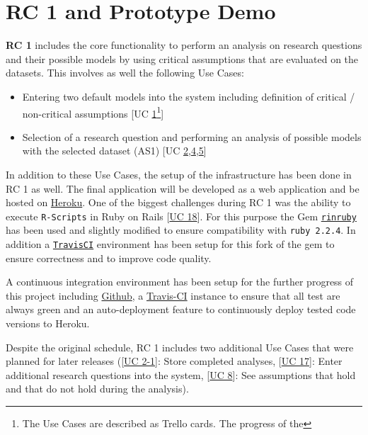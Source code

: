 \documentclass[11pt,twocolumn]{article}
\begin{document}
\section{ RC 1 and Prototype Demo}
\textbf{RC 1} includes the core functionality to perform an analysis on research questions and their possible models by using critical assumptions that are evaluated on the datasets. This involves as well the following Use Cases: 
\begin{itemize}
	\item Entering two default models into the system including definition of critical / non-critical assumptions [UC \href{https://trello.com/c/KEOokZp9}{1}\footnote{The Use Cases are described as Trello cards. The progress of the }]
\item  Selection of a research question and performing an analysis of possible models with the selected dataset (AS1) [UC \href{https://trello.com/c/ebVrFdA5}{2},\href{https://trello.com/c/7NINsfz8}{4},\href{https://trello.com/c/22JGne3r}{5}]
\end{itemize}

In addition to these Use Cases, the setup of the infrastructure has been done in RC 1 as well. The final application will be developed as a web application and be hosted on \href{http://heroku.com}{Heroku}. 
One of the biggest challenges during RC 1 was the ability to execute \texttt{R-Scripts} in Ruby on Rails [\href{https://trello.com/c/dpLHOxbB}{UC 18}]. For this purpose the Gem \href{https://github.com/sebastianzillessen/rinruby}{\texttt{rinruby}} has been used and slightly modified to ensure compatibility with \texttt{ruby 2.2.4}. In addition a \href{https://travis-ci.org/sebastianzillessen/rinruby}{\texttt{TravisCI}} environment has been setup for this fork of the gem to ensure correctness and to improve code quality. 

A continuous integration environment has been setup for the further progress of this project including \href{https://github.com/}{Github}, a \href{https://travis-ci.com}{Travis-CI} instance to ensure that all test are always green and an auto-deployment feature to continuously deploy tested code versions to Heroku. 

Despite the original schedule, RC 1 includes two additional Use Cases that were planned for later releases ([\href{https://trello.com/c/ORRBjISQ}{UC 2-1}]: Store completed analyses, [\href{https://trello.com/c/Hv2xe2UW}{UC 17}]: Enter additional research questions into the system, [\href{https://trello.com/c/be2088JH}{UC 8}]: See assumptions that hold and that do not hold during the analysis). 
\end{document}
